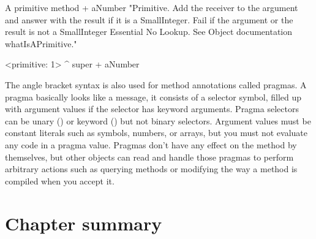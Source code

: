 \documentclass[a4paper,10pt,twoside]{book}
\begin{document}
\begin{method}[primitive]{A primitive method}
+ aNumber 
  "Primitive. Add the receiver to the argument and answer with the result
  if it is a SmallInteger. Fail if the argument or the result is not a
  SmallInteger  Essential  No Lookup. See Object documentation whatIsAPrimitive."

  <primitive: 1>
  ^ super + aNumber
\end{method}





The angle bracket syntax is also used for method annotations called pragmas.
A pragma basically looks like a message, it consists of a selector symbol, filled up with argument values if the selector has keyword arguments.
Pragma selectors can be unary () or keyword () but not binary selectors.
Argument values must be constant literals such as symbols, numbers, or arrays, but you must not evaluate any code in a pragma value.
Pragmas don't have any effect on the method by themselves, but other objects can read and handle those pragmas to perform arbitrary actions such as querying methods or modifying the way a method is compiled when you accept it.

\section{Chapter summary}
\end{document}
